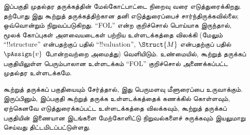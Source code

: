 \documentclass[../../include/open-logic-part]{subfiles}
\begin{document}

\begin{editorial}
  இப்பகுதி முதல்தர தருக்கத்தின் மேல்கோட்பாட்டை நிறைவு வரை எடுத்துரைக்கிறது.
  தற்போது இது கூற்றுத் தருக்கத்திற்கான தனி எடுத்துரைப்பைச் சார்ந்திருக்கவில்லை;
  ஒவ்வொன்றும் நிறுவப்படுகிறது. ``FOL'' என்ற குறிச்சொல் பொய்யாக இருந்தால்,
  மூலக் கோப்புகள் அளவையடைகள் பற்றிய உள்ளடக்கத்தை விலக்கி
  (மேலும் ``!!{structure}'' என்பதற்குப் பதில் ``!!{valuation}'',
  $\Struct{M}$ என்பதற்குப் பதில் $\pAssign{v}$ போன்றவற்றை அமைத்து) வெளியிடும்.
  உண்மையில், கூற்றுத் தருக்கப் பகுதியிலுள்ள பெரும்பாலான உள்ளடக்கம் ``FOL''
  குறிச்சொல் அணைக்கப்பட்ட முதல்தர உள்ளடக்கமே.

  கூற்றுத் தருக்கப் பகுதியையும் சேர்த்தால், இது பெருமளவு மீளுரைப்பை உருவாக்கும்.
  இருப்பினும், இப்பகுதி கூற்றுத் தருக்க உள்ளடக்கத்தைக் கணக்கில் கொள்ளவும்,
  ஏற்கெனவே எடுத்துரைக்கப்பட்ட உள்ளடக்கத்தை விலக்கவும், கூற்றுத் தருக்கப்
  பகுதியின் இணையான இடங்களை மேற்கோளிட்டு நிறுவல்களைச் சுருக்கவும் இயலுமாறு
  செய்வது திட்டமிடப்பட்டுள்ளது.
\end{editorial}












\OLEndPartHook
\end{document}

